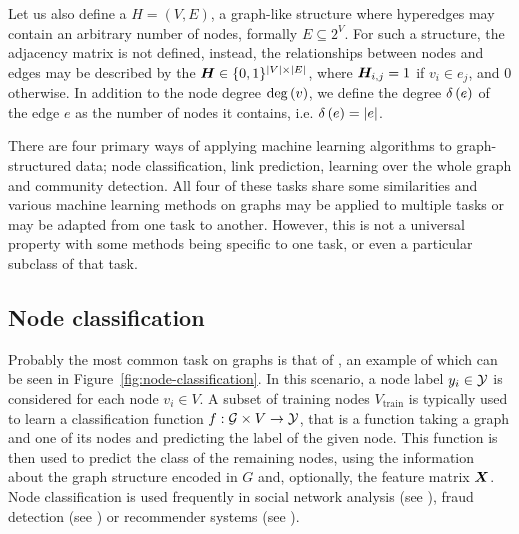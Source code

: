 Let us also define a  \( H = \left( V, E \right) \), a graph-like structure where hyperedges may contain an arbitrary number of nodes, formally \( E \subseteq 2^V \). For such a structure, the adjacency matrix is not defined, instead, the relationships between nodes and edges may be described by the  \( \bm{H} \in \{ 0, 1 \}^{\left\lvert V \right\rvert \times \left\lvert E \right\rvert}\), where \( \bm{H}_{i, j} = 1 \) if \( v_i \in e_j \), and \( 0 \) otherwise. In addition to the node degree \( \mathrm{deg} \left( v \right) \), we define the degree \( \delta \left( e \right) \) of the edge \( e \) as the number of nodes it contains, i.e. \( \delta \left( e \right) = \left\lvert e \right\rvert \).

There are four primary ways of applying machine learning algorithms to graph-structured data; node classification, link prediction, learning over the whole graph and community detection. All four of these tasks share some similarities and various machine learning methods on graphs may be applied to multiple tasks or may be adapted from one task to another. However, this is not a universal property with some methods being specific to one task, or even a particular subclass of that task.

\subsection{Node classification}

Probably the most common task on graphs is that of , an example of which can be seen in Figure~\ref{fig:node-classification}. In this scenario, a node label \( y_i \in \mathcal{Y} \) is considered for each node \( v_i \in V \). A subset of training nodes \( V_\mathrm{train} \) is typically used to learn a classification function \( f : \mathcal{G} \times V \to \mathcal{Y} \), that is a function taking a graph and one of its nodes and predicting the label of the given node. This function is then used to predict the class of the remaining nodes, using the information about the graph structure encoded in \( G \) and, optionally, the feature matrix \( \bm{X} \). Node classification is used frequently in social network analysis (see \cite{perozzi_deepwalk_2014}), fraud detection (see \cite{akoglu_graph_2015}) or recommender systems (see \cite{berg_graph_2017}).

